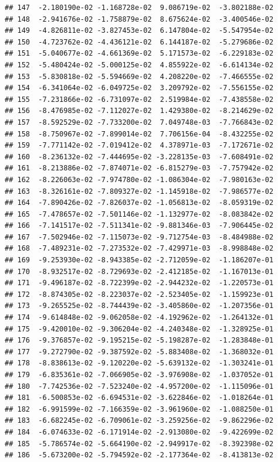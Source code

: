 \documentclass[
]{article}
\begin{document}
\begin{verbatim}
## 147  -2.180190e-02 -1.168728e-02  9.086719e-02  -3.802188e-02
## 148  -2.941676e-02 -1.758879e-02  8.675624e-02  -3.400546e-02
## 149  -4.826811e-02 -3.827453e-02  6.147804e-02  -5.547954e-02
## 150  -4.723762e-02 -4.436121e-02  6.144187e-02  -5.279686e-02
## 151  -5.040677e-02 -4.661369e-02  5.171573e-02  -6.229183e-02
## 152  -5.480424e-02 -5.000125e-02  4.855922e-02  -6.614134e-02
## 153  -5.830818e-02 -5.594669e-02  4.208220e-02  -7.466555e-02
## 154  -6.341064e-02 -6.049725e-02  3.209792e-02  -7.556155e-02
## 155  -7.231866e-02 -6.731097e-02  2.519984e-02  -7.438558e-02
## 156  -8.476985e-02 -7.112027e-02  1.429380e-02  -8.214629e-02
## 157  -8.592529e-02 -7.733200e-02  7.049748e-03  -7.766843e-02
## 158  -8.750967e-02 -7.899014e-02  7.706156e-04  -8.432255e-02
## 159  -7.771142e-02 -7.019412e-02  4.378971e-03  -7.172671e-02
## 160  -8.236132e-02 -7.444695e-02 -3.228135e-03  -7.608491e-02
## 161  -8.213886e-02 -7.874071e-02 -6.815279e-03  -7.757942e-02
## 162  -8.226063e-02 -7.974780e-02 -1.086304e-02  -7.980163e-02
## 163  -8.326161e-02 -7.809327e-02 -1.145918e-02  -7.986577e-02
## 164  -7.890426e-02 -7.826037e-02 -1.056813e-02  -8.059319e-02
## 165  -7.478657e-02 -7.501146e-02 -1.132977e-02  -8.083842e-02
## 166  -7.141517e-02 -7.511341e-02 -9.881346e-03  -7.906445e-02
## 167  -7.502946e-02 -7.115073e-02 -9.712754e-03  -8.484988e-02
## 168  -7.489231e-02 -7.273532e-02 -7.429971e-03  -8.998848e-02
## 169  -9.253930e-02 -8.943385e-02 -2.712059e-02  -1.186207e-01
## 170  -8.932517e-02 -8.729693e-02 -2.412185e-02  -1.167013e-01
## 171  -9.496187e-02 -8.722399e-02 -2.944232e-02  -1.220573e-01
## 172  -8.874305e-02 -8.223037e-02 -2.523405e-02  -1.159923e-01
## 173  -9.265525e-02 -8.744439e-02 -3.405860e-02  -1.207356e-01
## 174  -9.614848e-02 -9.062058e-02 -4.192962e-02  -1.264132e-01
## 175  -9.420010e-02 -9.306204e-02 -4.240348e-02  -1.328925e-01
## 176  -9.376857e-02 -9.195215e-02 -5.198287e-02  -1.283848e-01
## 177  -9.272790e-02 -9.387592e-02 -5.883408e-02  -1.368032e-01
## 178  -8.838613e-02 -9.120220e-02 -5.639132e-02  -1.303241e-01
## 179  -6.835361e-02 -7.066905e-02 -3.976908e-02  -1.037052e-01
## 180  -7.742536e-02 -7.523240e-02 -4.957200e-02  -1.115096e-01
## 181  -6.500853e-02 -6.694531e-02 -3.622846e-02  -1.018264e-01
## 182  -6.991599e-02 -7.166359e-02 -3.961960e-02  -1.088250e-01
## 183  -6.682245e-02 -6.709061e-02 -3.259256e-02  -9.862296e-02
## 184  -6.074633e-02 -6.171914e-02 -2.913080e-02  -9.422699e-02
## 185  -5.786574e-02 -5.664190e-02 -2.949917e-02  -8.392398e-02
## 186  -5.673200e-02 -5.794592e-02 -2.177364e-02  -8.413813e-02

\end{verbatim}
\end{document}
